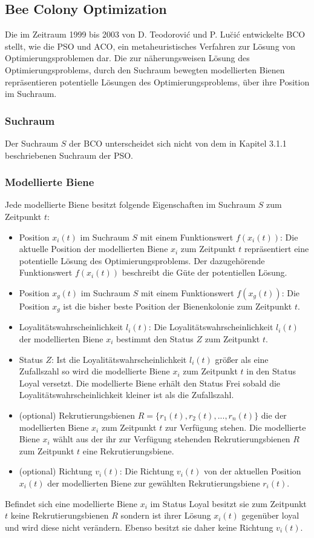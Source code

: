 \documentclass[a4paper, 11pt]{article}
\begin{document}
\subsection{Bee Colony Optimization}
Die im Zeitraum 1999 bis 2003 von D. Teodorovi\'{c} und P. Lu\u{c}i\'{c} entwickelte \ac{BCO} stellt, wie die \acs{PSO} und \acs{ACO}, ein metaheuristisches Verfahren zur Lösung von Optimierungsproblemen dar. Die zur näherungsweisen Lösung des Optimierungsproblems, durch den Suchraum bewegten modellierten Bienen repräsentieren potentielle Lösungen des Optimierungsproblems, über ihre Position im Suchraum. 
\subsubsection{Suchraum}
Der Suchraum $S$ der \acs{BCO} unterscheidet sich nicht von dem in Kapitel 3.1.1 beschriebenen Suchraum der \acs{PSO}. 
\subsubsection{Modellierte Biene}
Jede modellierte Biene besitzt folgende Eigenschaften im Suchraum $S$ zum Zeitpunkt $t$:
\begin{itemize}
	\item Position $x_{i}(t)$ im Suchraum $S$ mit einem Funktionswert $f(x_{i}(t))$: Die aktuelle Position der modellierten Biene $x_{i}$ zum Zeitpunkt $t$ repräsentiert eine potentielle Lösung des Optimierungsproblems. Der dazugehörende Funktionswert $f(x_{i}(t))$ beschreibt die Güte der potentiellen Lösung.
	\item Position $x_{g}(t)$ im Suchraum $S$ mit einem Funktionswert $f(x_{g}(t))$: Die Position $x_{g}$ ist die bisher beste Position der Bienenkolonie zum Zeitpunkt $t$.
	\item Loyalitätswahrscheinlichkeit $l_{i}(t)$: Die Loyalitätswahrscheinlichkeit $l_{i}(t)$ der modellierten Biene $x_{i}$ bestimmt den Status $Z$ zum Zeitpunkt $t$.
	\item Status $Z$: Ist die Loyalitätswahrscheinlichkeit $l_{i}(t)$ größer als eine Zufallszahl so wird die modellierte Biene $x_{i}$ zum Zeitpunkt $t$ in den Status Loyal versetzt. Die modellierte Biene erhält den Status Frei sobald die Loyalitätswahrscheinlichkeit kleiner ist als die Zufallszahl.
	\item (optional) Rekrutierungsbienen  $R=\{r_{1}(t),r_{2}(t),...,r_{n}(t)\}$ die der modellierten Biene $x_{i}$ zum Zeitpunkt $t$ zur Verfügung stehen. Die modellierte Biene $x_{i}$ wählt aus der ihr zur Verfügung stehenden Rekrutierungsbienen $R$ zum Zeitpunkt $t$ eine Rekrutierungsbiene. 
	\item (optional) Richtung $v_{i}(t)$: Die Richtung $v_{i}(t)$ von der aktuellen Position $x_{i}(t)$ der modellierten Biene zur gewählten Rekrutierungsbiene $r_{i}(t)$.
\end{itemize}
Befindet sich eine modellierte Biene $x_{i}$ im Status Loyal besitzt sie zum Zeitpunkt $t$ keine Rekrutierungsbienen $R$ sondern ist ihrer Lösung $x_{i}(t)$ gegenüber loyal und wird diese nicht verändern. Ebenso besitzt sie daher keine Richtung $v_{i}(t)$.
\newpage
\end{document}
